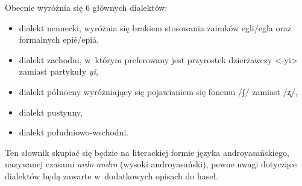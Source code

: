 \begin{spacing}{1.1}
Obecnie wyróżnia się 6 głównych dialektów: 

\begin{itemize}
    \item dialekt nennecki, wyróżnia się brakiem stosowania zaimków egli/egla oraz formalnych epié/epiá,
    \item dialekt zachodni, w~którym preferowany jest przyrostek dzierżawczy <-yi> zamiast partykuły \emph{yi},
    \item dialekt północny wyróżniający się pojawianiem się fonemu /ʃ/ zamiast /ʐ/,
    \item dialekt pustynny,
    \item dialekt południowo-wschodni.
\end{itemize}

Ten słownik skupiać się będzie na literackiej formie języka androyasańskiego, 
nazywanej czasami \emph{ardo andro} (wysoki androyasański), pewne uwagi 
dotyczące dialektów będą zawarte w~dodatkowych opisach do haseł.

\end{spacing}